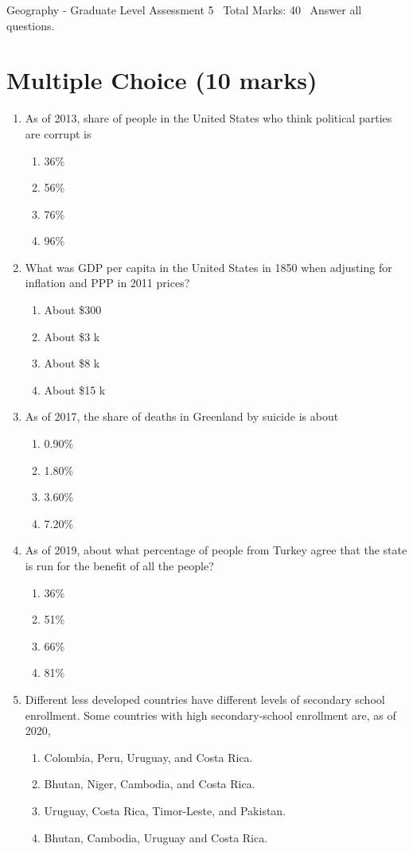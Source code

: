 \documentclass[12pt]{article}
\begin{document}
\begin{center}
Geography - Graduate Level Assessment 5 \
Total Marks: 40 \
Answer all questions.
\end{center}

\section*{Multiple Choice (10 marks)}
\begin{enumerate}[label=\arabic*.]
\item As of 2013, share of people in the United States who think political parties are corrupt is
\begin{enumerate}[label=(\alph*)]
    \item 36\%
    \item 56\%
    \item 76\%
    \item 96\%
\end{enumerate}
\item What was GDP per capita in the United States in 1850 when adjusting for inflation and PPP in 2011 prices?
\begin{enumerate}[label=(\alph*)]
    \item About \$300
    \item About \$3 k
    \item About \$8 k
    \item About \$15 k
\end{enumerate}
\item As of 2017, the share of deaths in Greenland by suicide is about
\begin{enumerate}[label=(\alph*)]
    \item 0.90\%
    \item 1.80\%
    \item 3.60\%
    \item 7.20\%
\end{enumerate}
\item As of 2019, about what percentage of people from Turkey agree that the state is run for the benefit of all the people?
\begin{enumerate}[label=(\alph*)]
    \item 36\%
    \item 51\%
    \item 66\%
    \item 81\%
\end{enumerate}
\item Different less developed countries have different levels of secondary school enrollment. Some countries with high secondary-school enrollment are, as of 2020,
\begin{enumerate}[label=(\alph*)]
    \item Colombia, Peru, Uruguay, and Costa Rica.
    \item Bhutan, Niger, Cambodia, and Costa Rica.
    \item Uruguay, Costa Rica, Timor-Leste, and Pakistan.
    \item Bhutan, Cambodia, Uruguay and Costa Rica.
\end{enumerate}
\end{enumerate}
\end{document}
